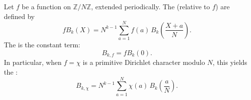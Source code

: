 Let $f$ be a function on $\mathbb{Z}/N\mathbb{Z}$, extended periodically. The  (relative to $f$) are defined by
$$
f B_k(X) = N^{k-1} \sum_{a=1}^{N} f(a) \, B_k\!\left(\frac{X + a}{N}\right).
$$
The  is the constant term:
$$
B_{k,f} = f B_k(0).
$$
In particular, when $f = \chi$ is a primitive Dirichlet character modulo $N$, this yields the :
$$
B_{k,\chi} = N^{k-1} \sum_{a=1}^{N} \chi(a) \, B_k\!\left(\frac{a}{N}\right).
$$
